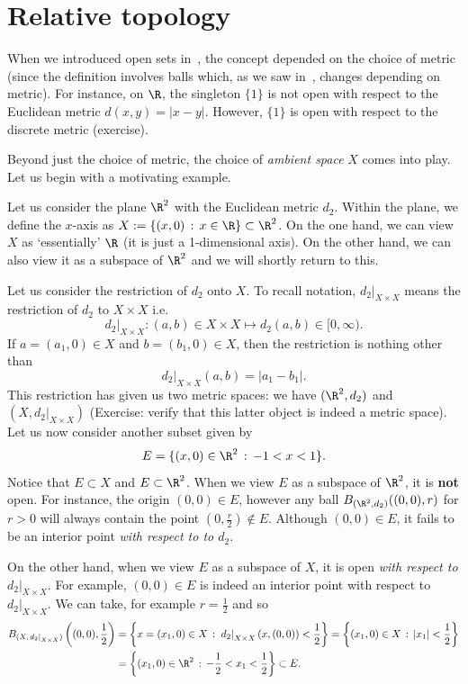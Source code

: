 \section{Relative topology}
\label{sec:rel_top}
When we introduced open sets in~, the concept depended on the choice of metric (since the definition involves balls which, as we saw in~, changes depending on metric). For instance, on $\R$, the singleton $\{1\}$ is not open with respect to the Euclidean metric $d(x,y) = |x-y|$. However, $\{1\}$ is open with respect to the discrete metric (exercise).

Beyond just the choice of metric, the choice of \textit{ambient space} $X$ comes into play. Let us begin with a motivating example.
\begin{eg}
Let us consider the plane $\R^2$ with the Euclidean metric $d_2$. Within the plane, we define the $x$-axis as $X:= \{(x,0)\, :\, x\in \R\}\subset \R^2$. On the one hand, we can view $X$ as `essentially' $\R$ (it is just a 1-dimensional axis). On the other hand, we can also view it as a subspace of $\R^2$ and we will shortly return to this.

Let us consider the restriction of $d_2$ onto $X$. To recall notation, $\left.d_2\right|_{X\times X}$ means the restriction of $d_2$ to $X\times X$ i.e.
\[
\left. d_2\right|_{X\times X}: (a,b) \in X\times X \mapsto d_2(a,b)\in [0,\infty).
\]
If $a=(a_1,0) \in X$ and $b = (b_1,0) \in X$, then the restriction is nothing other than
\[
\left.d_2\right|_{X\times X}(a,b) = |a_1-b_1|.
\]
This restriction has given us two metric spaces: we have $(\R^2,d_2)$ and $(X,\left.d_2\right|_{X\times X})$ (Exercise: verify that this latter object is indeed a metric space).
Let us now consider another subset given by
\[
E = \{(x,0) \in \R^2\, : \, -1 < x < 1\}.
\]
Notice that $E \subset X$ and $E \subset \R^2$. When we view $E$ as a subspace of $\R^2$, it is \textbf{not} open. For instance, the origin $(0,0) \in E$, however any ball $B_{(\R^2,d_2)}((0,0),r)$ for $r>0$ will always contain the point $(0,\frac{r}{2})\notin E$. Although $(0,0)\in E$, it fails to be an interior point \textit{with respect to to $d_2$}.

On the other hand, when we view $E$ as a subspace of $X$, it is open \textit{with respect to $\left.d_2\right|_{X\times X}$}. For example, $(0,0)\in E$ is indeed an interior point with respect to $\left.d_2\right|_{X\times X}$. We can take, for example $r = \frac{1}{2}$ and so
\begin{align*}
B_{(X,\left.d_2\right|_{X\times X})}\left((0,0),\frac{1}{2}\right) &= \left\{
x=(x_1,0)\in X \, : \, \left.d_2\right|_{X\times X}(x,(0,0))<\frac{1}{2}
\right\} = \left\{
(x_1,0)\in X \, : \, |x_1| < \frac{1}{2}
\right\} 	\\
&= \left\{
(x_1,0) \in \R^2 \, : \, -\frac{1}{2}< x_1 < \frac{1}{2}
\right\} \subset E.
\end{align*}
\end{eg}
